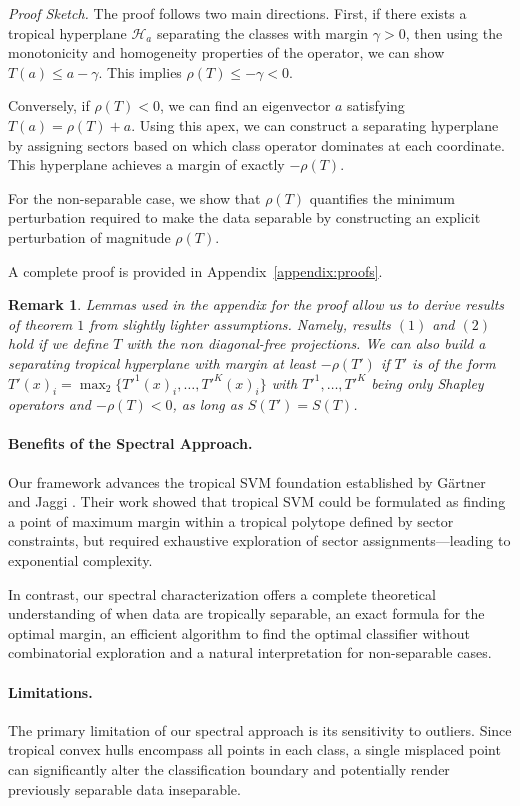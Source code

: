 \documentclass{article}
\newtheorem{remark}{Remark}
\begin{document}
\emph{Proof Sketch.}
The proof follows two main directions. First, if there exists a tropical hyperplane $\mathcal{H}_a$ separating the classes with margin $\gamma>0$, then using the monotonicity and homogeneity properties of the operator, we can show $T(a) \leq a - \gamma$. This implies $\rho(T) \leq -\gamma < 0$.

Conversely, if $\rho(T)<0$, we can find an eigenvector $a$ satisfying $T(a)=\rho(T)+a$. Using this apex, we can construct a separating hyperplane by assigning sectors based on which class operator dominates at each coordinate. This hyperplane achieves a margin of exactly $-\rho(T)$.

For the non-separable case, we show that $\rho(T)$ quantifies the minimum perturbation required to make the data separable by constructing an explicit perturbation of magnitude $\rho(T)$.

A complete proof is provided in Appendix~\ref{appendix:proofs}.

\begin{remark}
Lemmas used in the appendix for the proof allow us to derive results of theorem $1$ from slightly lighter assumptions. Namely, results $(1)$ and $(2)$ hold if we define $T$ with the non diagonal-free projections. We can also build a separating tropical hyperplane with margin at least $-\rho(T')$ if $T'$ is of the form  $T'(x)_i = \operatorname{\max}_2\{T'^1(x)_i, \dots, T'^K(x)_i\}$ with $T'^1, \ldots, T'^K$ being only Shapley operators and $-\rho(T)<0$, as long as $S(T') = S(T)$.
\end{remark}

\paragraph{Benefits of the Spectral Approach.} 
Our framework advances the tropical SVM foundation established by Gärtner and Jaggi \cite{gartner2008}. Their work showed that tropical SVM could be formulated as finding a point of maximum margin within a tropical polytope defined by sector constraints, but required exhaustive exploration of sector assignments—leading to exponential complexity.

In contrast, our spectral characterization offers a complete theoretical understanding of when data are tropically separable, an exact formula for the optimal margin, an efficient algorithm to find the optimal classifier without combinatorial exploration and a natural interpretation for non-separable cases.

\paragraph{Limitations.} 
The primary limitation of our spectral approach is its sensitivity to outliers. Since tropical convex hulls encompass all points in each class, a single misplaced point can significantly alter the classification boundary and potentially render previously separable data inseparable.
\end{document}
